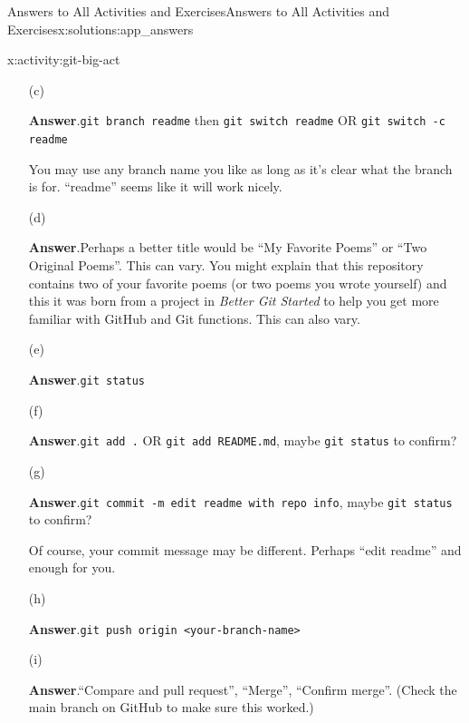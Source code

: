 \documentclass[oneside,10pt,]{book}
\newcommand{\blocktitlefont}{\relax}
\newcommand{\mono}[1]{\texttt{#1}}
\newcommand{\pubtitle}[1]{\textsl{#1}}
\begin{document}
\begin{solutions-chapter}{Answers to All Activities and Exercises}{}{Answers to All Activities and Exercises}{}{}{x:solutions:app_answers}
\begin{activitysolution}{4.11}{}{x:activity:git-big-act}
\begin{enumerate}[font=\bfseries,label=(\alph*),ref=\alph*]
\par\smallskip%
\noindent\textbf{\blocktitlefont Answer}.\hypertarget{g:answer:idp616528824-back}{}\quad{}Copy the HTTPS link on GitHub. Use \mono{git clone <copied-link>}. Use \mono{cd <repo-name>} to move your terminal into that repo.%
\item[(c)]\par\smallskip%
\noindent\textbf{\blocktitlefont Answer}.\hypertarget{g:answer:idp616541880-back}{}\quad{}\mono{git branch readme} then \mono{git switch readme} OR \mono{git switch -c readme}%
\par
You may use any branch name you like as long as it's clear what the branch is for. ``readme'' seems like it will work nicely.%
\item[(d)]\par\smallskip%
\noindent\textbf{\blocktitlefont Answer}.\hypertarget{g:answer:idp616537912-back}{}\quad{}Perhaps a better title would be ``My Favorite Poems'' or ``Two Original Poems''. This can vary. You might explain that this repository contains two of your favorite poems (or two poems you wrote yourself) and this it was born from a project in \pubtitle{Better Git Started} to help you get more familiar with GitHub and Git functions. This can also vary.%
\item[(e)]\par\smallskip%
\noindent\textbf{\blocktitlefont Answer}.\hypertarget{g:answer:idp616536376-back}{}\quad{}\mono{git status}%
\item[(f)]\par\smallskip%
\noindent\textbf{\blocktitlefont Answer}.\hypertarget{g:answer:idp616540600-back}{}\quad{}\mono{git add .} OR \mono{git add README.md}, maybe \mono{git status} to confirm?%
\item[(g)]\par\smallskip%
\noindent\textbf{\blocktitlefont Answer}.\hypertarget{g:answer:idp616551608-back}{}\quad{}\mono{git commit -m \textquotesingle{}edit readme with repo info\textquotesingle{}}, maybe \mono{git status} to confirm?%
\par
Of course, your commit message may be different. Perhaps ``edit readme'' and enough for you.%
\item[(h)]\par\smallskip%
\noindent\textbf{\blocktitlefont Answer}.\hypertarget{g:answer:idp616548152-back}{}\quad{}\mono{git push origin <your-branch-name>}%
\item[(i)]\par\smallskip%
\noindent\textbf{\blocktitlefont Answer}.\hypertarget{g:answer:idp616543928-back}{}\quad{}``Compare and pull request'', ``Merge'', ``Confirm merge''. (Check the main branch on GitHub to make sure this worked.)%

\end{enumerate}
\end{activitysolution}
\end{solutions-chapter}
\end{document}
